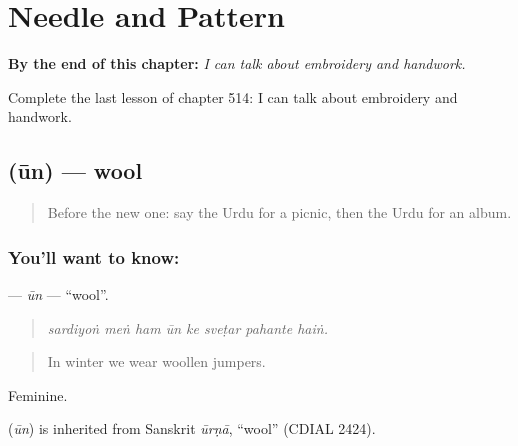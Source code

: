 
\chapter{Needle and Pattern}
\label{ch:ur-needle-and-pattern}

\begin{chapteropening}
\textbf{By the end of this chapter:} \emph{I can talk about embroidery and handwork.}

Complete the last lesson of chapter 514: I can talk about embroidery and handwork.
\end{chapteropening}

\section[\texorpdfstring{\ur{اون} (ūn)}{اون (ūn)}]{ (ūn) — wool}

\label{lesson:UR-C514-un}



\begin{quote}
Before the new one: say the Urdu for a picnic, then the Urdu for an album.
\end{quote}

\subsection*{You'll want to know: }
\textbf{} — \emph{ūn} — \textquotedblleft{}wool\textquotedblright{}.

\begin{quote}
       
\end{quote}

\begin{quote}
\emph{sardiyoṅ meṅ ham ūn ke sveṭar pahante haiṅ.}
\end{quote}

\begin{quote}
In winter we wear woollen jumpers.
\end{quote}

Feminine.

\begin{cousinweb}
\textbf{} (\emph{ūn}) is inherited from Sanskrit \emph{ūrṇā}, \textquotedblleft{}wool\textquotedblright{} (CDIAL 2424).
\end{cousinweb}

